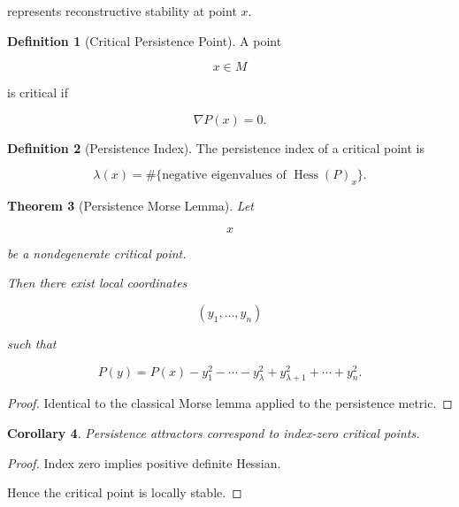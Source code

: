 \documentclass[12pt,oneside]{article}
\newtheorem{theorem}{Theorem}[section] \newtheorem{lemma}[theorem]{Lemma} \newtheorem{proposition}[theorem]{Proposition} \newtheorem{corollary}[theorem]{Corollary}
\theoremstyle{definition}
\newtheorem{definition}[theorem]{Definition} \newtheorem{axiom}[theorem]{Axiom} \newtheorem{remark}[theorem]{Remark} \newtheorem{example}[theorem]{Example}
\begin{document}
represents reconstructive stability at point \(x\).

\begin{definition}[Critical Persistence Point]

A point

\[
x\in M
\]

is critical if

\[
\nabla P(x)=0.
\]

\end{definition}

\begin{definition}[Persistence Index]

The persistence index of a critical point is

\[
\lambda(x)
=
\#\{
\text{negative eigenvalues of }
\operatorname{Hess}(P)_x
\}.
\]

\end{definition}

\begin{theorem}[Persistence Morse Lemma]

Let

\[
x
\]

be a nondegenerate critical point.

Then there exist local coordinates

\[
(y_1,\ldots,y_n)
\]

such that

\[
P(y)
=
P(x)
-
y_1^2
-\cdots-
y_\lambda^2
+
y_{\lambda+1}^2
+\cdots+
y_n^2.
\]

\end{theorem}

\begin{proof}

Identical to the classical Morse lemma applied to the persistence metric.

\end{proof}

\begin{corollary}

Persistence attractors correspond to index-zero critical points.

\end{corollary}

\begin{proof}

Index zero implies positive definite Hessian.

Hence the critical point is locally stable.

\end{proof}
\end{document}
